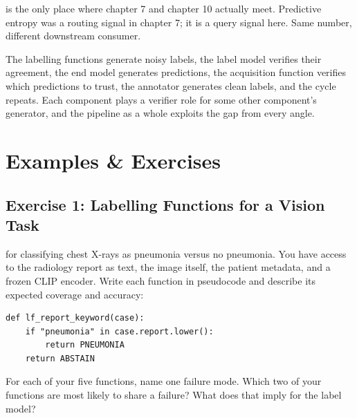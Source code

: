  is the only place where chapter 7 and chapter 10 actually meet. Predictive entropy was a routing signal in chapter 7; it is a query signal here. Same number, different downstream consumer.

 The labelling functions generate noisy labels, the label model verifies their agreement, the end model generates predictions, the acquisition function verifies which predictions to trust, the annotator generates clean labels, and the cycle repeats. Each component plays a verifier role for some other component's generator, and the pipeline as a whole exploits the gap from every angle.



\newpage
\section{Examples \& Exercises}


\subsection{Exercise 1: Labelling Functions for a Vision Task}

 for classifying chest X-rays as pneumonia versus no pneumonia. You have access to the radiology report as text, the image itself, the patient metadata, and a frozen CLIP encoder. Write each function in pseudocode and describe its expected coverage and accuracy:

\begin{verbatim}
def lf_report_keyword(case):
    if "pneumonia" in case.report.lower():
        return PNEUMONIA
    return ABSTAIN
\end{verbatim}

 For each of your five functions, name one failure mode. Which two of your functions are most likely to share a failure? What does that imply for the label model?

